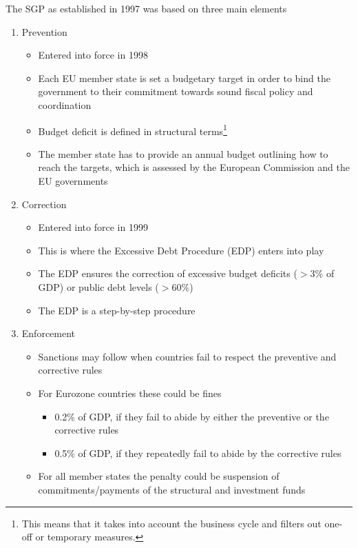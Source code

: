 \documentclass{tufte-handout}
\begin{document}
The SGP as established in 1997 was based on three main elements
\begin{enumerate}
  \item Prevention
  \begin{itemize}
    \item Entered into force in 1998
    \item Each EU member state is set a budgetary target in order to bind the government to their commitment towards sound fiscal policy and coordination
    \item Budget deficit is defined in structural terms\footnote{This means that it takes into account the business cycle and filters out one-off or temporary measures.}
    \item The member state has to provide an annual budget outlining how to reach the targets, which is assessed by the European Commission and the EU governments
  \end{itemize}
    
  \item Correction
  \begin{itemize}
    \item Entered into force in 1999
    \item This is where the Excessive Debt Procedure (EDP) enters into play
    \item The EDP ensures the correction of excessive budget deficits ($>3$\% of GDP) or public debt levels ($>60$\%)
    \item The EDP is a step-by-step procedure
  \end{itemize}

  \item Enforcement
  \begin{itemize}
    \item Sanctions may follow when countries fail to respect the preventive and corrective rules
    \item For Eurozone countries these could be fines
    \begin{itemize}
      \item 0.2\% of GDP, if they fail to abide by either the preventive or the corrective rules
      \item 0.5\% of GDP, if they repeatedly fail to abide by the corrective rules
    \end{itemize}
    \item For all member states the penalty could be suspension of commitments/payments of the structural and investment funds 
  \end{itemize}
\end{enumerate}
\end{document}
